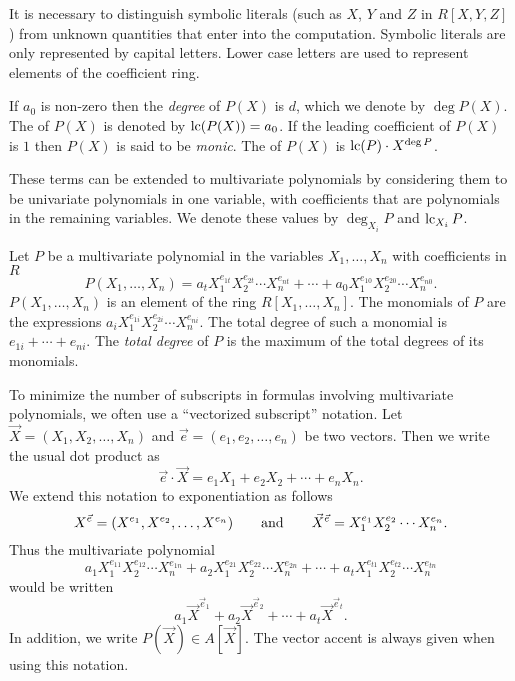 It is necessary to distinguish symbolic literals (such as $X$, $Y$ and
$Z$ in $R[X,Y,Z]$) from unknown quantities that enter into the
computation.  Symbolic literals are only represented by capital
letters.  Lower case letters are used to represent elements of the
coefficient ring.

If $a_{0}$ is non-zero then the {\em degree} of $P(X)$ is $d$, which
we denote by $\deg P(X)$. The  of $P(X)$ is denoted by
$\operatorname{lc} (P(X)) = a_{0}$. If the
leading coefficient of $P(X)$ is $1$ then $P(X)$ is said to be {\em
monic}. The  of $P(X)$ is
$\operatorname{lc}(P) \cdot X^{\deg P}$.

These terms can be extended to multivariate polynomials by considering
them to be univariate polynomials in one variable, with coefficients
that are polynomials in the remaining variables. We denote these values by $\deg_{X_{i}} P$ and
$\operatorname{lc}_{X_{i}} P$.

Let $P$ be a multivariate polynomial in the variables $X_{1}, \ldots,
X_{n}$ with coefficients in $R$
\[
P(X_{1}, \ldots, X_{n}) = 
a_{t} X_{1}^{e_{1t}} X_{2}^{e_{2t}} \cdots X_{n}^{e_{nt}}
+
\cdots
+
a_{0} X_{1}^{e_{10}} X_{2}^{e_{20}} \cdots X_{n}^{e_{n0}}.
\]
$P(X_{1}, \ldots, X_{n})$ is an element of the ring $R[X_{1}, \ldots,
X_{n}]$.  The monomials of $P$ are the expressions $a_{i}
X_{1}^{e_{1i}} X_{2}^{e_{2i}} \cdots X_{n}^{e_{ni}}$.  The total
degree of such a monomial is $e_{1i} + \cdots + e_{ni}$.  The {\em
total degree} of $P$ is the maximum of the total degrees of its
monomials.

To minimize the number of subscripts in formulas involving
multivariate polynomials, we often use a ``vectorized subscript''
notation.  Let $\vec X = (X_1, X_2, \ldots, X_n)$ and $\vec e = (e_1,
e_2, \ldots, e_n)$ be two vectors.  Then we write the usual 
dot product as
\[
\vec e \cdot \vec X = e_1 X_1 + e_2 X_2 + \cdots + e_n X_n.
\]
We extend this notation to exponentiation as follows 
\[
X^{\vec e} = (X^{e_1}, X^{e_2},\ldots, X^{e_n})
\qquad\hbox{and}\qquad 
{\vec X}^{\vec e} = X_1^{e_1} X_2^{e_2} \cdots X_n^{e_n}.
\]
Thus the multivariate polynomial
\[
a_1 X_1^{e_{11}} X_2^{e_{12}} \cdots X_n^{e_{1n}}+ a_2 X_1^{e_{21}} X_2^{e_{22}} \cdots X_n^{e_{2n}} + 
\cdots + a_t X_1^{e_{t1}} X_2^{e_{t2}} \cdots X_n^{e_{tn}}
\]
would be written
\[
a_1 \vec X^{\vec e_1} + a_2 \vec X^{\vec e_2} 
  + \cdots + a_t \vec X^{\vec e_t}.
\]
In addition, we write $P(\vec X) \in A[\vec X]$.  The vector accent is
always given when using this notation.


